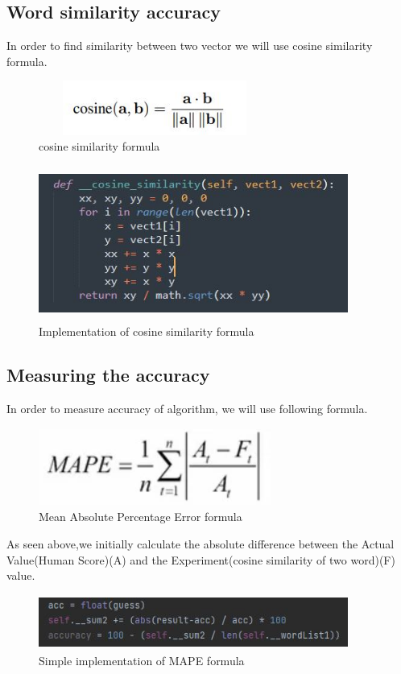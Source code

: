\documentclass{article}
\begin{document}
\subsection{Word similarity accuracy}
In order to find similarity between two vector we will use cosine similarity formula.
\begin{figure}[H]
    \centering
	\includegraphics[width=3in, height=0.7in]{15.JPG}
	\caption[Optional caption]{cosine similarity formula}
	\label{}
\end{figure}
\begin{figure}[H]
    \centering
	\includegraphics[width=4in, height=2in]{16.JPG}
	\caption[Optional caption]{Implementation of cosine similarity formula}
	\label{}
\end{figure} 
\subsection{Measuring the accuracy}
In order to measure accuracy of algorithm, we will use following formula.
\begin{figure}[H]
    \centering
	\includegraphics[width=3in, height=1in]{19.JPG}
	\caption[Optional caption]{Mean Absolute Percentage Error formula}
	\label{}
\end{figure}
As seen above,we initially calculate the absolute difference between the Actual Value(Human Score)(A) and the Experiment(cosine similarity of two word)(F) value.
\begin{figure}[H]
    \centering
	\includegraphics[width=4in, height=0.7in]{20.JPG}
	\caption[Optional caption]{Simple implementation of MAPE formula}
	\label{}
\end{figure} 
\cleardoublepage
\end{document}
